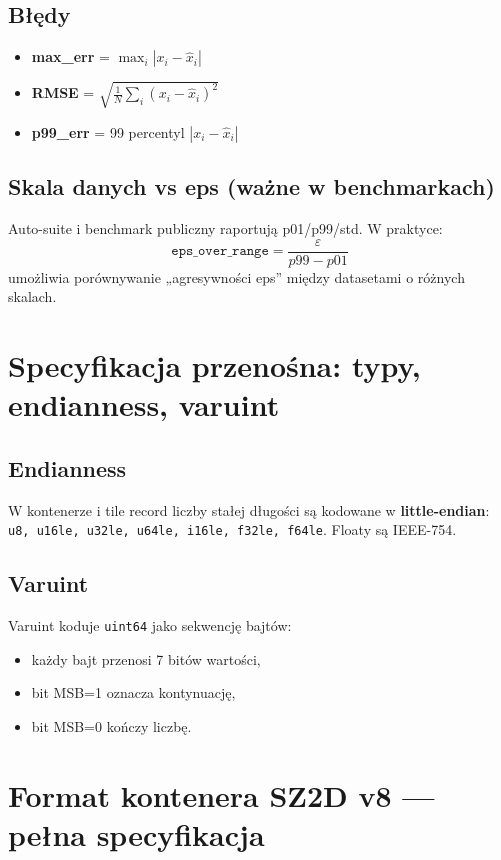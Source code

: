 \documentclass[11pt,a4paper]{article}
\begin{document}
\subsection{Błędy}
\begin{itemize}
  \item \textbf{max\_err} = $\max_i |x_i - \hat{x}_i|$
  \item \textbf{RMSE} = $\sqrt{\frac{1}{N}\sum_i (x_i-\hat{x}_i)^2}$
  \item \textbf{p99\_err} = 99 percentyl $|x_i-\hat{x}_i|$
\end{itemize}

\subsection{Skala danych vs eps (ważne w benchmarkach)}
Auto-suite i benchmark publiczny raportują p01/p99/std. W praktyce:
\[
  \texttt{eps\_over\_range} = \frac{\varepsilon}{p99-p01}
\]
umożliwia porównywanie „agresywności eps” między datasetami o różnych skalach.

\section{Specyfikacja przenośna: typy, endianness, varuint}

\subsection{Endianness}
W kontenerze i tile record liczby stałej długości są kodowane w \textbf{little-endian}:
\texttt{u8, u16le, u32le, u64le, i16le, f32le, f64le}. Floaty są IEEE-754.

\subsection{Varuint}
Varuint koduje \texttt{uint64} jako sekwencję bajtów:
\begin{itemize}
  \item każdy bajt przenosi 7 bitów wartości,
  \item bit MSB=1 oznacza kontynuację,
  \item bit MSB=0 kończy liczbę.
\end{itemize}

\section{Format kontenera SZ2D v8 --- pełna specyfikacja}
\end{document}
